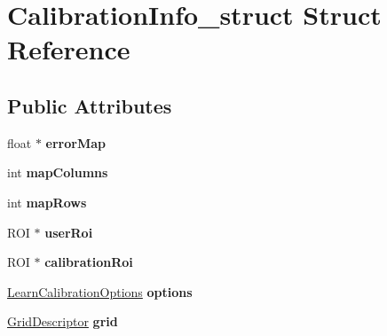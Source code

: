 \hypertarget{structCalibrationInfo__struct}{\section{\-Calibration\-Info\-\_\-struct \-Struct \-Reference}
\label{structCalibrationInfo__struct}
}
\subsection*{\-Public \-Attributes}
\begin{DoxyCompactItemize}
\item 
\hypertarget{structCalibrationInfo__struct_a5b30969974ee91bf9a346b4860408577}{float $\ast$ {\bfseries error\-Map}}\label{structCalibrationInfo__struct_a5b30969974ee91bf9a346b4860408577}

\item 
\hypertarget{structCalibrationInfo__struct_ab56f6922d5a7c65e04ee97139048023e}{int {\bfseries map\-Columns}}\label{structCalibrationInfo__struct_ab56f6922d5a7c65e04ee97139048023e}

\item 
\hypertarget{structCalibrationInfo__struct_a45b60263ee43957bb10e9ac35e2e7e6f}{int {\bfseries map\-Rows}}\label{structCalibrationInfo__struct_a45b60263ee43957bb10e9ac35e2e7e6f}

\item 
\hypertarget{structCalibrationInfo__struct_ae2bd8cfbf68035154be679104871ae7a}{\-R\-O\-I $\ast$ {\bfseries user\-Roi}}\label{structCalibrationInfo__struct_ae2bd8cfbf68035154be679104871ae7a}

\item 
\hypertarget{structCalibrationInfo__struct_ae27c6fd8f374b22643606c3d2e65d1d8}{\-R\-O\-I $\ast$ {\bfseries calibration\-Roi}}\label{structCalibrationInfo__struct_ae27c6fd8f374b22643606c3d2e65d1d8}

\item 
\hypertarget{structCalibrationInfo__struct_ad02d1a36cd112999d61bfc1392792090}{\hyperlink{structLearnCalibrationOptions__struct}{\-Learn\-Calibration\-Options} {\bfseries options}}\label{structCalibrationInfo__struct_ad02d1a36cd112999d61bfc1392792090}

\item 
\hypertarget{structCalibrationInfo__struct_add7b10d7a280e674c885bb525ede1e98}{\hyperlink{structGridDescriptor__struct}{\-Grid\-Descriptor} {\bfseries grid}}\label{structCalibrationInfo__struct_add7b10d7a280e674c885bb525ede1e98}


\end{DoxyCompactItemize}
